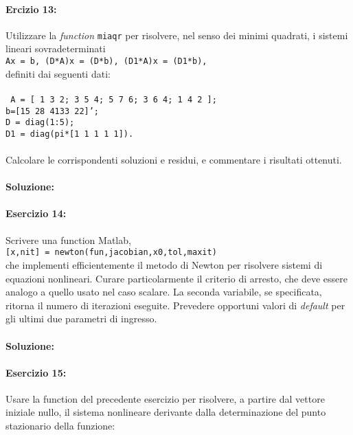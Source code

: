 \documentclass[12pt]{article}
\begin{document}
\paragraph{Ercizio 13:}Utilizzare la \textit{function} \texttt{miaqr} per risolvere, nel senso dei minimi quadrati, i sistemi lineari sovradeterminati\\
\texttt{Ax = b, \;\;\;\;\;\;(D*A)x = (D*b),\;\;\;\;\;\; (D1*A)x = (D1*b),}\\
definiti dai seguenti dati:\\\\
\texttt{
A = [ 1 3 2; 3 5 4; 5 7 6; 3 6 4; 1 4 2 ]; \\
b=[15 28 4133 22]';\\
D = diag(1:5);\\
D1 = diag(pi*[1 1 1 1 1]).}\\\\
Calcolare le corrispondenti soluzioni e residui, e commentare i risultati ottenuti.
\paragraph{Soluzione:}
\paragraph{Esercizio 14:}Scrivere una function Matlab,\\
\texttt{[x,nit] = newton(fun,jacobian,x0,tol,maxit)}\\
che implementi efficientemente il metodo di Newton per risolvere sistemi di equazioni nonlineari. 
Curare particolarmente il criterio di arresto, che deve essere analogo a quello usato nel caso scalare. 
La seconda variabile, se specificata, ritorna il numero di iterazioni eseguite. Prevedere opportuni valori 
di \textit{default} per gli ultimi due parametri di ingresso.
\paragraph{Soluzione:}

\paragraph{Esercizio 15:} Usare la function del precedente esercizio per risolvere, a partire dal vettore iniziale nullo, 
il sistema nonlineare derivante dalla determinazione del punto stazionario della funzione:
\end{document}
